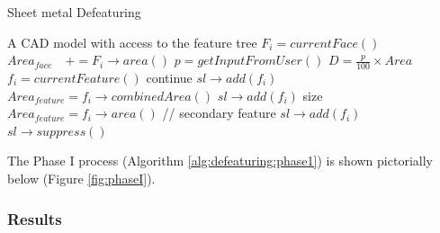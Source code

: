 
\begin{algorithm}[!h]
	\caption{Sheet metal Defeaturing}
	\label{alg:defeaturing:phase1}
	\begin{algorithmic}
		\REQUIRE A CAD model with access to the feature tree
			\STATE $F_i = currentFace()$
			\STATE $Area_{face} \quad += F_i \rightarrow area()$
		\ENDWHILE		
		\STATE $p = getInputFromUser()$
		\STATE $D = \frac{p}{100} \times Area$  \hspace{60mm}%
			\STATE $f_i = currentFeature()$
				\STATE continue
				\STATE $sl \rightarrow add(f_i)$
			  	\STATE $Area_{feature} = f_i \rightarrow combinedArea()$ \hspace{20mm}  %
			  		\STATE $sl \rightarrow add(f_i)$
				\ENDIF
			\ELSE      
				\STATE size $Area_{feature} = f_i \rightarrow area()$  // secondary feature
			  		\STATE $sl \rightarrow add(f_i)$
				\ENDIF				
			\ENDIF
		\ENDWHILE
		\STATE  $sl \rightarrow suppress()$
	\end{algorithmic}
\end{algorithm}


The Phase I process (Algorithm \ref{alg:defeaturing:phase1}) is shown pictorially below (Figure  \ref{fig:phaseI}).

\subsubsection{Results}

